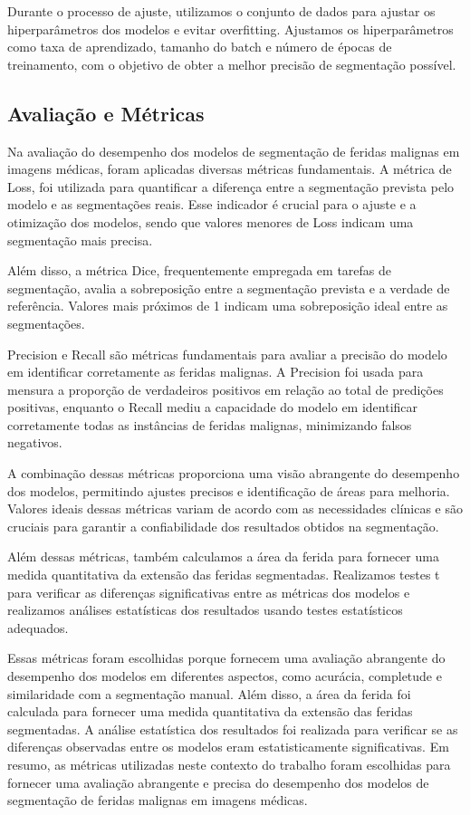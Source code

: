     Durante o processo de ajuste, utilizamos o conjunto de dados para ajustar os hiperparâmetros dos modelos e evitar overfitting. Ajustamos os hiperparâmetros como taxa de aprendizado, tamanho do batch e número de épocas de treinamento, com o objetivo de obter a melhor precisão de segmentação possível.

\subsection{Avaliação e Métricas}
    Na avaliação do desempenho dos modelos de segmentação de feridas malignas em imagens médicas, foram aplicadas diversas métricas fundamentais. A métrica de Loss, foi utilizada para quantificar a diferença entre a segmentação prevista pelo modelo e as segmentações reais. Esse indicador é crucial para o ajuste e a otimização dos modelos, sendo que valores menores de Loss indicam uma segmentação mais precisa.

    Além disso, a métrica Dice, frequentemente empregada em tarefas de segmentação, avalia a sobreposição entre a segmentação prevista e a verdade de referência. Valores mais próximos de 1 indicam uma sobreposição ideal entre as segmentações.

    Precision e Recall são métricas fundamentais para avaliar a precisão do modelo em identificar corretamente as feridas malignas. A Precision foi usada para mensura a proporção de verdadeiros positivos em relação ao total de predições positivas, enquanto o Recall mediu a capacidade do modelo em identificar corretamente todas as instâncias de feridas malignas, minimizando falsos negativos.

    A combinação dessas métricas proporciona uma visão abrangente do desempenho dos modelos, permitindo ajustes precisos e identificação de áreas para melhoria. Valores ideais dessas métricas variam de acordo com as necessidades clínicas e são cruciais para garantir a confiabilidade dos resultados obtidos na segmentação.

    Além dessas métricas, também calculamos a área da ferida para fornecer uma medida quantitativa da extensão das feridas segmentadas. Realizamos testes t para verificar as diferenças significativas entre as métricas dos modelos e realizamos análises estatísticas dos resultados usando testes estatísticos adequados.

    Essas métricas foram escolhidas porque fornecem uma avaliação abrangente do desempenho dos modelos em diferentes aspectos, como acurácia, completude e similaridade com a segmentação manual. Além disso, a área da ferida foi calculada para fornecer uma medida quantitativa da extensão das feridas segmentadas. A análise estatística dos resultados foi realizada para verificar se as diferenças observadas entre os modelos eram estatisticamente significativas. Em resumo, as métricas utilizadas neste contexto do trabalho foram escolhidas para fornecer uma avaliação abrangente e precisa do desempenho dos modelos de segmentação de feridas malignas em imagens médicas.

